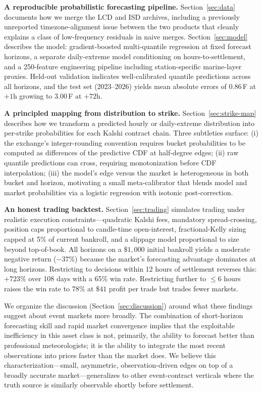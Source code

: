 \documentclass[11pt]{article}
\begin{document}
\textbf{A reproducible probabilistic forecasting pipeline.} Section~\ref{sec:data}
documents how we merge the LCD and ISD archives, including a previously
unreported timezone-alignment issue between the two products that cleanly
explains a class of low-frequency residuals in naive merges. Section~\ref{sec:model}
describes the model: gradient-boosted multi-quantile regression at fixed
forecast horizons, a separate daily-extreme model conditioning on hours-to-settlement,
and a 250-feature engineering pipeline including station-specific marine-layer
proxies. Held-out validation indicates well-calibrated quantile predictions
across all horizons, and the test set (2023--2026) yields mean absolute errors
of $0.86$\,\textdegree F at $+1$h growing to $3.00$\,\textdegree F at $+72$h.

\textbf{A principled mapping from distribution to strike.} Section~\ref{sec:strike-map}
describes how we transform a predicted hourly or daily-extreme distribution into
per-strike probabilities for each Kalshi contract chain. Three subtleties
surface: (i) the exchange's integer-rounding convention requires bucket
probabilities to be computed as differences of the predictive CDF at half-degree
edges; (ii) raw quantile predictions can cross, requiring monotonization before
CDF interpolation; (iii) the model's edge versus the market is heterogeneous in
both bucket and horizon, motivating a small meta-calibrator that blends model
and market probabilities via a logistic regression with isotonic post-correction.

\textbf{An honest trading backtest.} Section~\ref{sec:trading} simulates trading
under realistic execution constraints---quadratic Kalshi fees, mandatory
spread-crossing, position caps proportional to candle-time open-interest,
fractional-Kelly sizing capped at 5\% of current bankroll, and a slippage model
proportional to size beyond top-of-book. All horizons on a $\$1{,}000$ initial
bankroll yields a moderate negative return ($-37\%$) because the market's
forecasting advantage dominates at long horizons. Restricting to decisions
within 12 hours of settlement reverses this: $+723\%$ over 108 days with a
65\% win rate. Restricting further to $\le 6$ hours raises the win rate to
78\% at $\$41$ profit per trade but trades fewer markets.

We organize the discussion (Section~\ref{sec:discussion}) around what these
findings suggest about event markets more broadly. The combination of
short-horizon forecasting skill and rapid market convergence implies that the
exploitable inefficiency in this asset class is not, primarily, the ability to
forecast better than professional meteorologists; it is the ability to integrate
the most recent observations into prices faster than the market does. We
believe this characterization---small, asymmetric, observation-driven edges
on top of a broadly accurate market---generalizes to other event-contract
verticals where the truth source is similarly observable shortly before
settlement.
\end{document}
